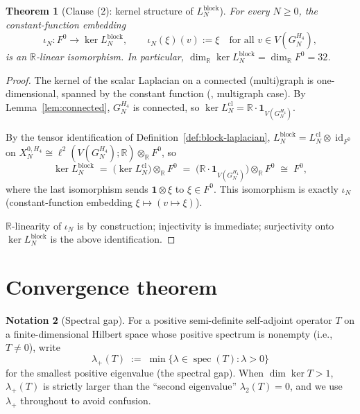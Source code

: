 \documentclass[11pt]{article}
\newcommand{\R}{\mathbb{R}}
\newcommand{\spec}{\operatorname{spec}}
\newcommand{\id}{\operatorname{id}}
\newtheorem{theorem}{Theorem}[section]
\theoremstyle{definition}
\newtheorem{notation}[theorem]{Notation}
\begin{document}
\begin{theorem}[Clause (2): kernel structure of
$L_N^{\mathrm{block}}$]
\label{thm:kernel}
For every $N \geq 0$, the constant-function embedding
\[
  \iota_N \colon F^0 \to \ker L_N^{\mathrm{block}},
  \qquad \iota_N(\xi)(v) := \xi \quad \text{for all }
  v \in V(G_N^{H_4}),
\]
is an $\R$-linear isomorphism. In particular,
$\dim_{\R} \ker L_N^{\mathrm{block}} = \dim_{\R} F^0 = 32$.
\end{theorem}

\begin{proof}
The kernel of the scalar Laplacian on a connected (multi)graph
is one-dimensional, spanned by the constant function
(\cite[Ch.~1]{Chung}, multigraph case). By Lemma~\ref{lem:connected},
$G_N^{H_4}$ is connected, so $\ker L^{\mathrm{cl}}_N = \R \cdot
\mathbf{1}_{V(G_N^{H_4})}$.

By the tensor identification of Definition~\ref{def:block-laplacian},
$L_N^{\mathrm{block}} = L^{\mathrm{cl}}_N \otimes \id_{F^{0}}$ on
$X_N^{0, H_4} \cong \ell^2(V(G_N^{H_4}); \R) \otimes_{\R} F^{0}$,
so
\[
  \ker L_N^{\mathrm{block}}
  \;=\; \bigl(\ker L^{\mathrm{cl}}_N\bigr) \otimes_{\R} F^{0}
  \;=\; \bigl(\R \cdot \mathbf{1}_{V(G_N^{H_4})}\bigr) \otimes_{\R} F^{0}
  \;\cong\; F^{0},
\]
where the last isomorphism sends $\mathbf{1} \otimes \xi$ to
$\xi \in F^{0}$. This isomorphism is exactly $\iota_N$
(constant-function embedding $\xi \mapsto (v \mapsto \xi)$).

$\R$-linearity of $\iota_N$ is by construction; injectivity is
immediate; surjectivity onto $\ker L_N^{\mathrm{block}}$ is the
above identification.
\end{proof}

\section{Convergence theorem}
\label{sec:convergence}

\begin{notation}[Spectral gap]
\label{not:lambda-plus}
For a positive semi-definite self-adjoint operator $T$ on a
finite-dimensional Hilbert space whose positive spectrum is
nonempty (i.e., $T \neq 0$), write
\[
  \lambda_{+}(T)
  \;:=\; \min\bigl\{\lambda \in \spec(T) : \lambda > 0\bigr\}
\]
for the smallest positive eigenvalue (the spectral gap). When
$\dim \ker T > 1$, $\lambda_{+}(T)$ is strictly larger than the
``second eigenvalue'' $\lambda_2(T) = 0$, and we use $\lambda_{+}$
throughout to avoid confusion.
\end{notation}
\end{document}
